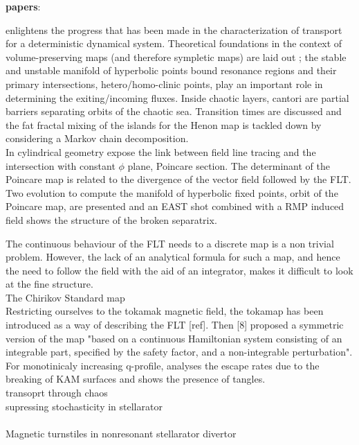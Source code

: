 \textbf{papers}:

\cite{meiss_thirty_2015} enlightens the progress that has been made in the characterization of transport for a deterministic dynamical system. Theoretical foundations in the context of volume-preserving maps (and therefore sympletic maps) are laid out ; the stable and unstable manifold of hyperbolic points bound resonance regions and their primary intersections, hetero/homo-clinic points, play an important role in determining the exiting/incoming fluxes. Inside chaotic layers, cantori are partial barriers separating orbits of the chaotic sea. Transition times are discussed and the fat fractal mixing of the islands for the Henon map is tackled down by considering a Markov chain decomposition.
\\[10pt]
In cylindrical geometry \cite{wei_invariant_2023} expose the link between field line tracing and the intersection with constant $\phi$ plane, Poincare section. The determinant of the Poincare map is related to the divergence of the vector field followed by the FLT. Two evolution to compute the manifold of hyperbolic fixed points, orbit of the Poincare map, are presented and an EAST shot combined with a RMP induced field shows the structure of the broken separatrix.

The continuous behaviour of the FLT needs to a discrete map is a non trivial problem.
However, the lack of an analytical formula for such a map, and hence the need to follow the field with the aid of an integrator, makes it difficult to look at the fine structure.
\\[10pt]
The Chirikov Standard map  
\\[10pt]
Restricting ourselves to the tokamak magnetic field, the tokamap has been introduced as a way of describing the FLT [ref]. Then [8] proposed a symmetric version of the map "based on a continuous Hamiltonian system consisting of an integrable part, specified by the safety factor, and a non-integrable perturbation". For monotinicaly increasing q-profile, \cite{wingen_stochastic_2005} analyses the escape rates due to the breaking of KAM surfaces and shows the presence of tangles. 
\\[10pt]
transoprt through chaos \cite{easton_transport_1991}
\\[10pt]
supressing stochasticity in stellarator \cite{hanson_elimination_1984}
\\[10pt]

\\[10pt]
Magnetic turnstiles in nonresonant stellarator divertor
\\[10pt]

